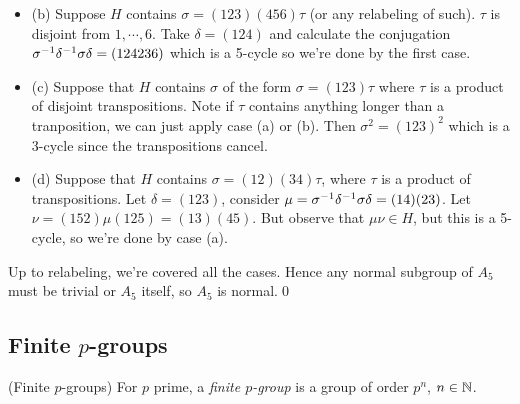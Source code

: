 \documentclass{article}
\begin{document}
\begin{itemize}
\begin{itemize}
	\item (b) Suppose $ H $ contains $ \sigma=(123)(456)\tau $ (or any relabeling of such). $ \tau $ is disjoint from $ 1,\cdots,6 $. Take $ \delta = (124) $ and calculate the conjugation $ {\sigma}^{-1}{\delta}^{-1}\sigma\delta=(124236) $ which is a 5-cycle so we're done by the first case.
	\item (c) Suppose that $ H $ contains $ \sigma $ of the form $ \sigma = (123)\tau $ where $ \tau $ is a product of disjoint transpositions. Note if $ \tau $ contains anything longer than a tranposition, we can just apply case (a) or (b). Then $ \sigma^2=(123)^2 $ which is a 3-cycle since the transpositions cancel.
	\item (d) Suppose that $ H $ contains $ \sigma=(12)(34)\tau $, where $ \tau $ is a product of transpositions. Let $ \delta = (123) $, consider $ \mu = {\sigma}^{-1}{\delta}^{-1}\sigma\delta=(14)(23) $. Let $ \nu = (152)\mu(125) = (13)(45) $. But observe that $ \mu\nu\in H $, but this is a 5-cycle, so we're done by case (a).
\end{itemize} 
Up to relabeling, we're covered all the cases. Hence any normal subgroup of $ A_5 $ must be trivial or $ A_5 $ itself, so $ A_5 $ is normal.\qed
\subsection{Finite $p$-groups}
\begin{definition}
	(Finite $ p $-groups) For $ p $ prime, a \textit{finite $ p $-group} is a group of order $ p^n $, $ n\in\mathbb{N} $.
\end{definition}


\end{itemize}
\end{document}
